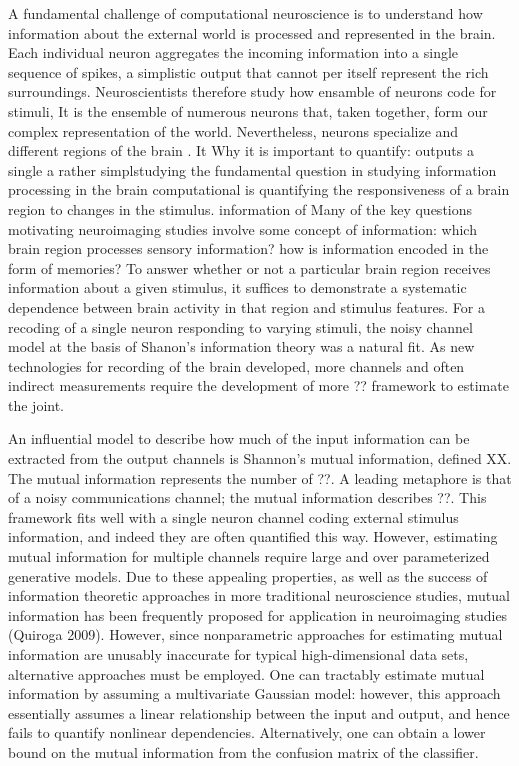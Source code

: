\documentclass[12pt]{article}
\begin{document}

A fundamental challenge of computational neuroscience is to understand
how information about the external world is processed and represented
in the brain. Each individual neuron aggregates the incoming
information into a single sequence of spikes, a simplistic output that
cannot per itself represent the rich surroundings. Neuroscientists
therefore study how ensamble of neurons code for stimuli, It is the
ensemble of numerous neurons that, taken together, form our complex
representation of the world. Nevertheless, neurons specialize and
different regions of the brain . It Why it is important to quantify:
outputs a single a rather simplstudying the fundamental question in
studying information processing in the brain computational is
quantifying the responsiveness of a brain region to changes in the
stimulus. information of Many of the key questions motivating
neuroimaging studies involve some concept of information: which brain
region processes sensory information?  how is information encoded in
the form of memories? To answer whether or not a particular brain
region receives information about a given stimulus, it suffices to
demonstrate a systematic dependence between brain activity in that
region and stimulus features. For a recoding of a single neuron
responding to varying stimuli, the noisy channel model at the basis of
Shanon’s information theory was a natural fit. As new technologies for
recording of the brain developed, more channels and often indirect
measurements require the development of more ?? framework to
estimate the joint.

An influential model to describe how much of the input information can
be extracted from the output channels is Shannon’s mutual information,
defined XX. The mutual information represents the number of ??. A
leading metaphore is that of a noisy communications channel; the
mutual information describes ??. This framework fits well with a
single neuron channel coding external stimulus information, and indeed
they are often quantified this way. However, estimating mutual
information for multiple channels require large and over parameterized
generative models. Due to these appealing properties, as well as the
success of information theoretic approaches in more traditional
neuroscience studies, mutual information has been frequently proposed
for application in neuroimaging studies (Quiroga 2009).  However,
since nonparametric approaches for estimating mutual information are
unusably inaccurate for typical high-dimensional data sets,
alternative approaches must be employed.  One can tractably estimate
mutual information by assuming a multivariate Gaussian model: however,
this approach essentially assumes a linear relationship between the
input and output, and hence fails to quantify nonlinear dependencies.
Alternatively, one can obtain a lower bound on the mutual information
from the confusion matrix of the classifier.
\end{document}
